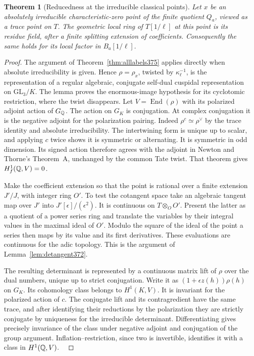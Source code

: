 \documentclass[a4paper,11pt]{article}
\newtheorem{theorem}[proposition]{Theorem}
\theoremstyle{definition}
\theoremstyle{remark}
\numberwithin{equation}{section}
\begin{document}
\begin{theorem}[Reducedness at the irreducible classical points]
\label{thm:rigidtrace377}
Let \(x\) be an absolutely irreducible characteristic-zero
point of the finite quotient \(Q_a\), viewed as a trace
point on \(T\). The geometric local ring of \(T[1/\ell]\)
at this point is its residue field, after a finite splitting
extension of coefficients. Consequently the same holds
for its local factor in \(B_a[1/\ell]\).
\end{theorem}
\begin{proof}
The argument of Theorem~\ref{thm:alllabels375} applies
directly when absolute irreducibility is given. Hence
\(\rho=\rho_x\), twisted by \(\kappa_\ell^{-1}\), is
the representation of a regular algebraic, conjugate
self-dual cuspidal representation on \(\mathrm{GL}_3/K\).
The lemma proves the enormous-image hypothesis for its
cyclotomic restriction, where the twist disappears. Let
\(V=\operatorname{End}(\rho)\) with its polarized adjoint
action of \(G_\mathbb Q\). The action on \(G_K\) is conjugation.
At complex conjugation it is the negative adjoint for the
polarization pairing. Indeed \(\rho^c\simeq\rho^\vee\) by
the trace identity and absolute irreducibility. The
intertwining form is unique up to scalar, and applying
\(c\) twice shows it is symmetric or alternating. It is
symmetric in odd dimension. Its signed action therefore
agrees with the adjoint in Newton and Thorne's Theorem~A,
unchanged by the common Tate twist. That theorem gives
\(H^1_f(\mathbb Q,V)=0\).~\cite{VIII-VI-VI-nt119}

Make the coefficient extension so that the point is rational
over a finite extension \(J'/J\), with integer
ring \(O'\). To test the cotangent space take an algebraic
tangent map over \(J'\) into \(J'[\epsilon]/(\epsilon^2)\).
It is continuous on \(T\otimes_O O'\). Present the latter
as a quotient of a power series ring and translate the
variables by their integral values in the maximal ideal
of \(O'\). Modulo the square of the ideal of the point
a series then maps by its value and its first derivatives.
These evaluations are continuous for the adic topology.
This is the argument of Lemma~\ref{lem:detangent372}.

The resulting determinant is represented by a continuous
matrix lift of \(\rho\) over the dual numbers, unique up
to strict conjugation. Write it as
\((1+\epsilon z(h))\rho(h)\) on \(G_K\). Its cohomology
class belongs to \(H^1(K,V)\). It is invariant for the
polarized action of \(c\). The conjugate lift and its
contragredient have the same trace, and after identifying
their reductions by the polarization they are strictly
conjugate by uniqueness for the irreducible determinant.
Differentiating gives precisely invariance of the class
under negative adjoint and conjugation of the group
argument. Inflation--restriction, since two is invertible,
identifies it with a class in \(H^1(\mathbb Q,V)\).
~\cite{VIII-VI-chenevier364}


\end{proof}
\end{document}
